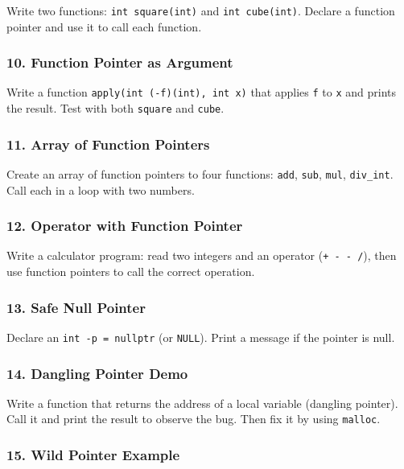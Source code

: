 \documentclass[
  letterpaper,
  DIV=11,
  numbers=noendperiod]{scrreprt}
\begin{document}
Write two functions: \texttt{int\ square(int)} and
\texttt{int\ cube(int)}. Declare a function pointer and use it to call
each function.

\subsubsection{10. Function Pointer as
Argument}\label{function-pointer-as-argument}

Write a function \texttt{apply(int\ (-f)(int),\ int\ x)} that applies
\texttt{f} to \texttt{x} and prints the result. Test with both
\texttt{square} and \texttt{cube}.

\subsubsection{11. Array of Function
Pointers}\label{array-of-function-pointers}

Create an array of function pointers to four functions: \texttt{add},
\texttt{sub}, \texttt{mul}, \texttt{div\_int}. Call each in a loop with
two numbers.

\subsubsection{12. Operator with Function
Pointer}\label{operator-with-function-pointer}

Write a calculator program: read two integers and an operator
(\texttt{+\ -\ -\ /}), then use function pointers to call the correct
operation.

\subsubsection{13. Safe Null Pointer}\label{safe-null-pointer}

Declare an \texttt{int\ -p\ =\ nullptr} (or \texttt{NULL}). Print a
message if the pointer is null.

\subsubsection{14. Dangling Pointer Demo}\label{dangling-pointer-demo}

Write a function that returns the address of a local variable (dangling
pointer). Call it and print the result to observe the bug. Then fix it
by using \texttt{malloc}.

\subsubsection{15. Wild Pointer Example}\label{wild-pointer-example}
\end{document}
